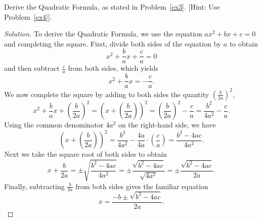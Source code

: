 \documentclass[12pt]{amsart}
\begin{document}
\begin{thm}\label{bonus}
  Derive the Quadratic Formula, as stated in Problem~\ref{ex3}.
  [Hint: Use Problem~\ref{ex4}].
  
  \begin{proof}[Solution]
    To derive the Quadratic Formula, we use the equation $ax^2 + bx + c = 0$ and completing the square.
    First, divide both sides of the equation by $a$ to obtain
    $$x^2 + \frac{b}{a}x + \frac{c}{a} = 0$$
    and then subtract $\frac{c}{a}$ from both sides, which yields
    $$x^2 + \frac{b}{a}x = -\frac{c}{a}.$$
    We now complete the square by adding to both sides the quantity $\displaystyle{\left(\frac{b}{2a}\right)^2},$
    $$x^2 + \frac{b}{a}x + \left(\frac{b}{2a}\right)^2 = \left(x + \left(\frac{b}{2a}\right) \right)^2 = \left(\frac{b}{2a}\right)^2 -\frac{c}{a} = \frac{b^2}{4a^2} - \frac{c}{a}.$$
    Using the common denominator $4a^2$ on the right-hand side, we have
    $$\left(x + \left(\frac{b}{2a}\right) \right)^2 = \frac{b^2}{4a^2} - \frac{4a}{4a} \cdot \left(\frac{c}{a}\right) = \frac{b^2 - 4ac}{4a^2}.$$
    Next we take the square root of both sides to obtain
    $$x + \frac{b}{2a} = \pm \sqrt{\frac{b^2 - 4ac}{4a^2}} = \pm \frac{\sqrt{b^2 - 4ac}}{\sqrt{4a^2}} = \pm\frac{\sqrt{b^2 - 4ac}}{2a}.$$
    Finally, subtracting $\frac{b}{2a}$ from both sides gives the familiar equation
    $$x = \frac{-b \pm \sqrt{b^2 - 4ac}}{2a}.$$
  \end{proof}
\end{thm}
\end{document}

